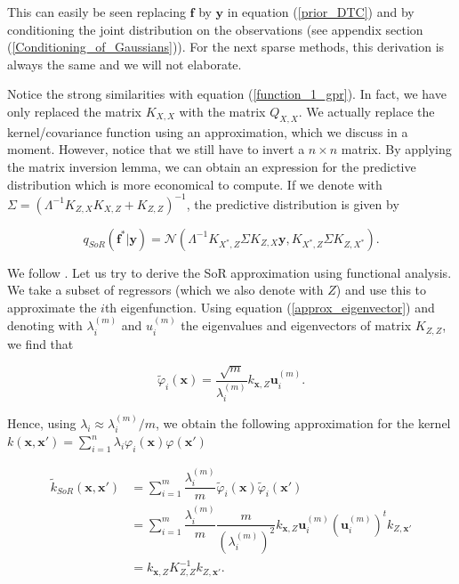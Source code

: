 \documentclass[12pt,a4paper,oneside]{book}
\begin{document}
This can easily be seen replacing $\bm{f}$ by $\bm{y}$ in equation (\ref{prior_DTC}) and by conditioning the joint distribution on the observations (see appendix section (\ref{Conditioning_of_Gaussians})).  For the next sparse methods, this derivation is always the same and we will not elaborate. 

Notice the strong similarities with equation (\ref{function_1_gpr}). In fact, we have only replaced the matrix $K_{X,X}$ with the matrix $Q_{X,X}$. We actually replace the kernel/covariance function using an approximation, which we discuss in a moment. However, notice that we still have to invert a $n \times n$ matrix. By applying the matrix inversion lemma, we can obtain an expression for the predictive distribution which is more economical to compute. If we denote with $\Sigma = (\Lambda^{-1} K_{Z,X}K_{X,Z} + K_{Z,Z})^{-1}$, the predictive distribution is given by

\begin{equation}\label{pred_SoR}
\boxed{
q_{SoR} (\bm{f}^{\ast} | \bm{y} ) = \mathcal{N}(\Lambda^{-1} K_{X^{\ast},Z} \Sigma K_{Z,X} \bm{y},  K_{X^{\ast},Z} \Sigma K_{Z,X^{\ast}} ).}
\end{equation}

We follow \cite{GPRbook}. Let us try to derive the SoR approximation using functional analysis. We take a subset of regressors (which we also denote with $Z$) and use this to approximate the $i$th eigenfunction. Using equation (\ref{approx_eigenvector}) and denoting with $\lambda_i^{(m)}$ and $u_i^{(m)}$ the eigenvalues and eigenvectors of matrix $K_{Z,Z}$, we find that 

\begin{equation}
\tilde{\varphi}_i (\bm{x}) = \dfrac{\sqrt{m}}{\lambda_i^{(m)}} k_{\bm{x},Z} \bm{u}_i^{(m)}.
\end{equation}

Hence, using $\lambda_i  \approx  \lambda_i^{(m)}/m$, we obtain the following approximation for the kernel $k(\bm{x}, \bm{x}') = \sum\nolimits_{i=1}^n \lambda_i \varphi_i(\bm{x}) \varphi(\bm{x}')$ 

\begin{align}
\tilde{k}_{SoR}(\bm{x}, \bm{x}') &= \sum\limits_{i=1}^m \dfrac{\lambda_i^{(m)}}{m} \tilde{\varphi}_i(\bm{x})\tilde{\varphi}_i(\bm{x}') \nonumber  \\
&= \sum\limits_{i=1}^m  \dfrac{\lambda_i^{(m)}}{m} \dfrac{m}{(\lambda_i^{(m)})^2} k_{\bm{x},Z}  \bm{u}_i^{(m)} (\bm{u}_i^{(m)})^t k_{Z, \bm{x}'} \nonumber \\
&= k_{\bm{x},Z} K_{Z,Z}^{-1} k_{Z, \bm{x}'}.
\end{align}
\end{document}
